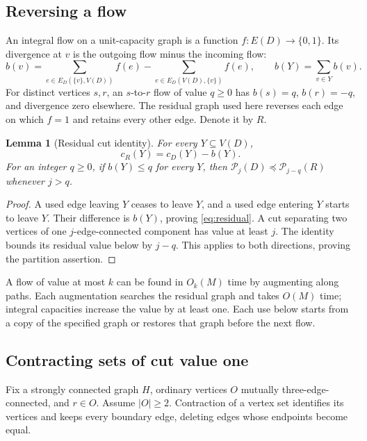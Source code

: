 \documentclass[11pt]{article}
\newtheorem{lemma}[theorem]{Lemma}
\theoremstyle{definition}
\theoremstyle{remark}
\newcommand{\PP}{\mathcal P}
\begin{document}
\subsection{Reversing a flow}
An integral flow on a unit-capacity graph is a function \(f:E(D)\to\{0,1\}\). Its divergence at \(v\) is the outgoing flow minus the incoming flow:
\[
 b(v)=\sum_{e\in E_D(\{v\},V(D))}f(e)-\sum_{e\in E_D(V(D),\{v\})}f(e),
 \qquad b(Y)=\sum_{v\in Y}b(v).
\]
For distinct vertices \(s,r\), an \(s\)-to-\(r\) flow of value \(q\ge0\) has \(b(s)=q\), \(b(r)=-q\), and divergence zero elsewhere. The residual graph used here reverses each edge on which \(f=1\) and retains every other edge. Denote it by \(R\).

\begin{lemma}[Residual cut identity]
\label{lem:residual}
For every \(Y\subseteq V(D)\),
\begin{equation}
 c_R(Y)=c_D(Y)-b(Y).
 \label{eq:residual}
\end{equation}
For an integer \(q\ge0\), if \(b(Y)\le q\) for every \(Y\), then
\(\PP_j(D)\preceq\PP_{j-q}(R)\) whenever \(j>q\).
\end{lemma}
\begin{proof}
A used edge leaving \(Y\) ceases to leave \(Y\), and a used edge entering \(Y\) starts to leave \(Y\). Their difference is \(b(Y)\), proving \eqref{eq:residual}. A cut separating two vertices of one \(j\)-edge-connected component has value at least \(j\). The identity bounds its residual value below by \(j-q\). This applies to both directions, proving the partition assertion.
\end{proof}
A flow of value at most \(k\) can be found in \(O_k(M)\) time by augmenting along paths. Each augmentation searches the residual graph and takes \(O(M)\) time; integral capacities increase the value by at least one. Each use below starts from a copy of the specified graph or restores that graph before the next flow.

\subsection{Contracting sets of cut value one}
\label{sec:one-contractions}
Fix a strongly connected graph \(H\), ordinary vertices \(O\) mutually three-edge-connected, and \(r\in O\). Assume \(|O|\ge2\). Contraction of a vertex set identifies its vertices and keeps every boundary edge, deleting edges whose endpoints become equal.
\end{document}
